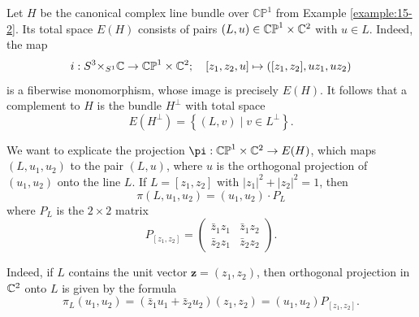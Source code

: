 \begin{example}\label{example:17-9}
  Let $H$ be the canonical complex line bundle over ${\mathbb{{CP}}}^1$ from Example \ref{example:15-2}. 
  Its total space $E(H)$ consists of pairs $({L,u})  \in  {\mathbb{{CP}}}^1 \times  {{\ensuremath{\mathbb{C}}}}^{2}$ with $u \in  L$. 
  Indeed, the map
  \[
    i:{S}^{3}{ \times  }_{{S}^1}{\mathbb{C}} \rightarrow  {\mathbb{{CP}}}^1 \times  {{\ensuremath{\mathbb{C}}}}^{2};\quad
    [ {{z}_1,{z}_{2},u}] \mapsto  ( {[  {{z}_1,{z}_{2}}] ,u{z}_1,u{z}_{2}})
  \]
  is a fiberwise monomorphism, whose image is precisely $E( H)$. It follows that a 
  complement to $H$ is the bundle ${H}^{ \bot  }$ with total space
  \[
    E( {H}^{ \bot  })  = \left\{  {( {L,v})  \mid  v \in  {L}^{ \bot  }}\right\} .
  \]

  We want to explicate the projection $\pi :{\mathbb{{CP}}}^1 \times  {\CC}^{2} \ra  E( H)$, 
  which maps $( {L,{u}_1,{u}_{2}})$ to the pair $(L, u)$, where $u$ is the orthogonal projection 
  of $( {{u}_1,{u}_{2}})$ onto the line $L$. If $L = [  {{z}_1,{z}_{2}}]$ 
  with ${\left| {z}_1\right| }^{2} + {\left| {z}_{2}\right| }^{2} = 1$, then
  \[
    \pi ( {L,{u}_1,{u}_{2}})  = ( {{u}_1,{u}_{2}})  \cdot  {P}_{L}
  \]
  where ${P}_{L}$ is the $2 \times 2$ matrix
  \[
    {P}_{[  {z}_1,{z}_{2}]  } =  
    \begin{pmatrix}
      {\bar{z}}_1{z}_1    & {\bar{z}}_1{z}_{2} \\  
      {\bar{z}}_{2}{z}_1  & {\bar{z}}_{2}{z}_{2}
    \end{pmatrix}.
  \]

  Indeed, if $L$ contains the unit vector $\mathbf{z} = ( {{z}_1,{z}_{2}})$, then orthogonal 
  projection in ${{\mathbb{C}}}^{2}$ onto $L$ is given by the formula
  \[
    {\pi }_{L}( {{u}_1,{u}_{2}})  
    = ( {{\bar{z}}_1{u}_1 + {\bar{z}}_{2}{u}_{2}}) ( {{z}_1,{z}_{2}})  
    = ( {{u}_1,{u}_{2}}) {P}_{[  {z}_1,{z}_{2}]  }.
  \]


\end{example}
